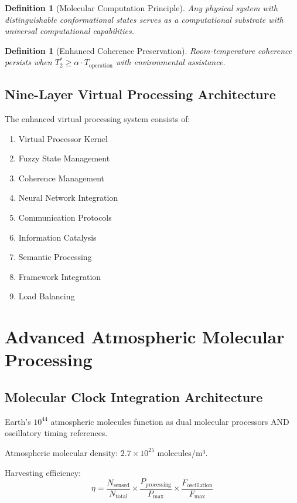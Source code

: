 \documentclass[12pt,a4paper]{article}
\newtheorem{definition}[theorem]{Definition}
\begin{document}
\begin{definition}[Molecular Computation Principle]
Any physical system with distinguishable conformational states serves as a computational substrate with universal computational capabilities.
\end{definition}

\begin{definition}[Enhanced Coherence Preservation]
Room-temperature coherence persists when $T_2^* \geq \alpha \cdot T_{\text{operation}}$ with environmental assistance.
\end{definition}

\subsection{Nine-Layer Virtual Processing Architecture}

The enhanced virtual processing system consists of:

\begin{enumerate}
\item Virtual Processor Kernel
\item Fuzzy State Management
\item Coherence Management
\item Neural Network Integration
\item Communication Protocols
\item Information Catalysis
\item Semantic Processing
\item Framework Integration
\item Load Balancing
\end{enumerate}

\section{Advanced Atmospheric Molecular Processing}

\subsection{Molecular Clock Integration Architecture}

Earth's $10^{44}$ atmospheric molecules function as dual molecular processors AND oscillatory timing references.

Atmospheric molecular density: $2.7 \times 10^{25}$ molecules/m³.

Harvesting efficiency:
\begin{equation}
\eta = \frac{N_{\text{sensed}}}{N_{\text{total}}} \times \frac{P_{\text{processing}}}{P_{\max}} \times \frac{F_{\text{oscillation}}}{F_{\max}}
\end{equation}
\end{document}
